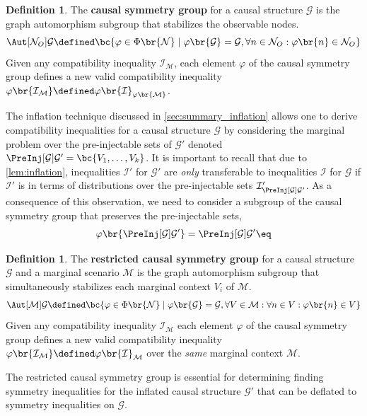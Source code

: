 \documentclass[aps, 10pt, english, twoside, pra, nofootinbib, longbibliography]{revtex4-1}
\theoremstyle{plain}
\theoremstyle{definition}
\newtheorem{definition}[theorem]{Definition}
\theoremstyle{remark}
\newcommand{\graph}{\mathcal{G}}
\newcommand{\nodes}{\mathcal{N}}
\newcommand{\term}[1]{\textcolor{Mahogany}{\textbf{#1}}}
\begin{document}
    \begin{definition}
        The \term{causal symmetry group} for a causal structure $\graph$ is the graph automorphism subgroup that stabilizes the observable nodes.
        \[ \Aut[\nodes_O]{\graph} \defined \bc{\varphi \in \Phi\br{\nodes} \mid \varphi\br{\graph} = \graph, \forall n \in \nodes_O :\varphi\br{n} \in \nodes_O} \]
        Given any compatibility inequality $\mathcal{I}_{\mathcal{M}}$, each element $\varphi$ of the causal symmetry group defines a new valid compatibility inequality $\varphi\br{\mathcal{I}_{\mathcal{M}}} \defined \varphi\br{\mathcal{I}}_{\varphi\br{\mathcal{M}}}$.
    \end{definition}

    The inflation technique discussed in \cref{sec:summary_inflation} allows one to derive compatibility inequalities for a causal structure $\graph$ by considering the marginal problem over the pre-injectable sets of $\graph'$ denoted $\PreInj[\graph]{\graph'} = \bc{V_1, \ldots, V_k}$. It is important to recall that due to \cref{lem:inflation}, inequalities $\mathcal{I}'$ for $\graph'$ are \textit{only} transferable to inequalities $\mathcal{I}$ for $\graph$ if $\mathcal{I}'$ is in terms of distributions over the pre-injectable sets $\mathcal{I}'_{\PreInj[\graph]{\graph'}}$. As a consequence of this observation, we need to consider a subgroup of the causal symmetry group that preserves the pre-injectable sets,
    \[ \varphi\br{\PreInj[\graph]{\graph'}} = \PreInj[\graph]{\graph'} \eq \label{eq:preserved_preinj} \]

    \begin{definition}
        The \term{restricted causal symmetry group} for a causal structure $\graph$ and a marginal scenario $\mathcal{M}$ is the graph automorphism subgroup that simultaneously stabilizes each marginal context $V_i$ of $\mathcal{M}$.
        \[ \Aut[\mathcal{M}]{\graph} \defined \bc{\varphi \in \Phi\br{\nodes} \mid \varphi\br{\graph} = \graph, \forall V \in \mathcal{M} : \forall n \in V: \varphi\br{n} \in V} \]
        Given any compatibility inequality $\mathcal{I}_{\mathcal{M}}$ each element $\varphi$ of the causal symmetry group defines a new valid compatibility inequality $\varphi\br{\mathcal{I}_{\mathcal{M}}} \defined \varphi\br{\mathcal{I}}_{\mathcal{M}}$ over the \textit{same} marginal context $\mathcal{M}$.
    \end{definition}

    The restricted causal symmetry group is essential for determining finding symmetry inequalities for the inflated causal structure $\graph'$ that can be deflated to symmetry inequalities on $\graph$.
\end{document}
